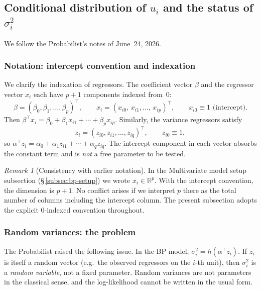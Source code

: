 \documentclass[a4paper,oneside,12pt]{extarticle}
\theoremstyle{plain}
\theoremstyle{definition}
\theoremstyle{remark}
\newtheorem{remark}[proposition]{Remark}
\begin{document}

\subsection{Conditional distribution of \texorpdfstring{$u_i$}{u\_i} and the status of \texorpdfstring{$\sigma_i^2$}{sigma\_i\^{}2}}
\label{subsec:cond-normal}

We follow the Probabilist's notes of June~24, 2026.

\subsubsection*{Notation: intercept convention and indexation}

We clarify the indexation of regressors.
The coefficient vector $\beta$ and the regressor vector $x_i$ each
have $p+1$ components indexed from~$0$:
\[
  \beta = (\beta_0, \beta_1, \ldots, \beta_p)^\top,
  \qquad
  x_i = (x_{i0},\, x_{i1},\ldots,\, x_{ip})^\top,
  \qquad
  x_{i0} \equiv 1 \text{ (intercept).}
\]
Then $\beta^\top x_i = \beta_0 + \beta_1 x_{i1} + \cdots + \beta_p x_{ip}$.
Similarly, the variance regressors satisfy
\[
  z_i = (z_{i0}, z_{i1}, \ldots, z_{iq})^\top,
  \qquad z_{i0} \equiv 1,
\]
so $\alpha^\top z_i = \alpha_0 + \alpha_1 z_{i1} + \cdots + \alpha_q z_{iq}$.
The intercept component in each vector absorbs the constant term
and is \emph{not} a free parameter to be tested.

\begin{remark}[Consistency with earlier notation]
In the Multivariate model setup subsection (§\,\ref{subsec:bp-setup})
we wrote $x_i \in \mathbb{R}^p$.  With the intercept convention, the
dimension is $p+1$.  No conflict arises if we interpret $p$ there as
the total number of columns including the intercept column.  The present
subsection adopts the explicit $0$-indexed convention throughout.
\end{remark}

\subsubsection*{Random variances: the problem}

The Probabilist raised the following issue.  In the BP model,
$\sigma_i^2 = h(\alpha^\top z_i)$.
If $z_i$ is itself a random vector (e.g.\ the observed regressors
on the $i$-th unit), then $\sigma_i^2$ is a \emph{random variable},
not a fixed parameter.  Random variances are not parameters in the
classical sense, and the log-likelihood cannot be written in the
usual form.
\end{document}
